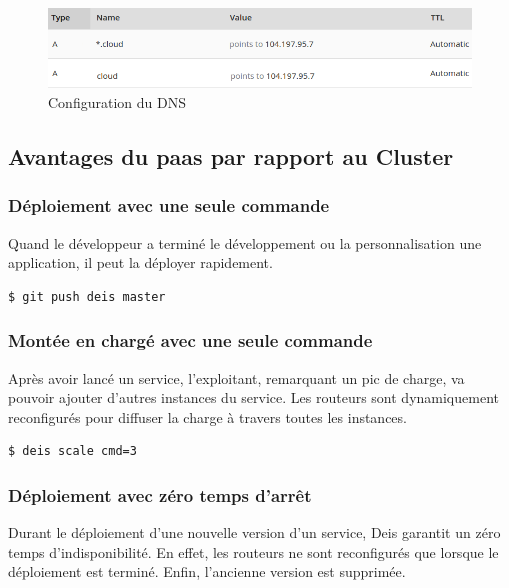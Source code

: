 \begin{onehalfspace}
\begin{figure}[H]
\centering
\includegraphics [scale=0.55]{chapitre5/assets/dns}
\caption{Configuration du DNS}
\label{fig:dns}
\end{figure}


\subsection{Avantages du \acrshort{paas} par rapport au Cluster}

\subsubsection*{Déploiement avec une seule commande}

	Quand le développeur a terminé le développement ou la personnalisation une application, il peut la déployer rapidement.

	\begin{lstlisting}[language=bash,caption=Déploiement avec Deis]
		$ git push deis master
	\end{lstlisting}

\subsubsection*{Montée en chargé avec une seule commande}

Après avoir lancé un service, l'exploitant, remarquant un pic de charge, va pouvoir ajouter d'autres instances du service. Les routeurs sont dynamiquement reconfigurés pour diffuser la charge à travers toutes les instances.

	\begin{lstlisting}[language=bash,caption=Montée en charge]
		$ deis scale cmd=3
	\end{lstlisting}

\subsubsection*{Déploiement avec zéro temps d'arrêt}

Durant le déploiement d'une nouvelle version d'un service, Deis garantit un zéro temps d'indisponibilité. En effet, les routeurs ne sont reconfigurés que lorsque le déploiement est terminé. Enfin, l'ancienne version est supprimée.



\end{onehalfspace}
